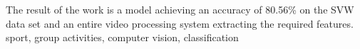 \documentclass[
    left=2.5cm,         %
    right=2.5cm,        %
    top=2.5cm,          %
    bottom=3cm,         %
    bindingoffset=6mm,  %
    nohyphenation=false %
]{eiti/eiti-thesis}
\begin{document}
The result of the work is a model achieving an accuracy of 80.56\% on the SVW data set \cite{svw} and an entire video processing system extracting the required features.
\keywords sport, group activities, computer vision, classification

\cleardoublepage  %
\pagestyle{plain}
\makeauthorship

\cleardoublepage %
\tableofcontents

\cleardoublepage %
\pagestyle{headings}

  
  
  
  
                            
\cleardoublepage %
\printbibliography

\newpage
\pagestyle{plain}

\vspace{0.8cm}
\acronymlist
{}

\listoffigurestoc     %
\vspace{1cm}          %
\listoftablestoc      %
\vspace{1cm}          %
\listofappendicestoc  %



\end{document}
